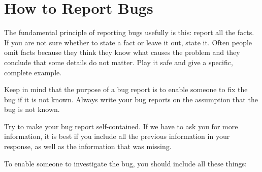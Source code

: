 \section[How to Report Bugs]{How to Report Bugs
  \label{sec:how-to-report-bugs}
  }

The fundamental principle of reporting bugs usefully is this: report
all the facts.  If you are not sure whether to state a fact or leave
it out, state it.  Often people omit facts because they think they
know what causes the problem and they conclude that some details do
not matter.  Play it safe and give a specific, complete example.

Keep in mind that the purpose of a bug report is to enable someone to
fix the bug if it is not known.  Always write your bug reports on the
assumption that the bug is not known.

Try to make your bug report self-contained.  If we have to ask you for
more information, it is best if you include all the previous
information in your response, as well as the information that was
missing.

To enable someone to investigate the bug, you should include all these
things:

